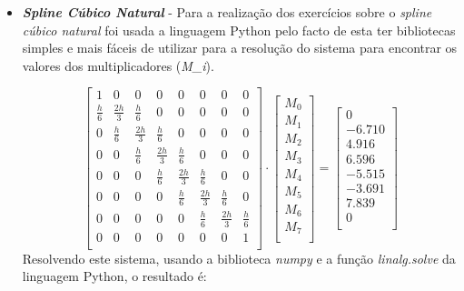 \documentclass[12pt, letterpaper,fleqn]{article}
\begin{document}
\begin{itemize}
    \item \textbf{\textit{Spline Cúbico Natural}} - Para a realização dos exercícios sobre o \textit{spline cúbico natural} foi usada a linguagem Python pelo facto de esta ter bibliotecas simples e mais fáceis de utilizar para a resolução do sistema para encontrar os valores dos multiplicadores (\textit{M_i}).

    $$
    \begin{bmatrix}
    1 & 0 & 0 & 0 & 0 & 0 & 0 & 0 \\[6pt]
    \frac{h}{6} & \frac{2h}{3} & \frac{h}{6} & 0 & 0 & 0 & 0 & 0 \\[6pt]
    0 & \frac{h}{6} & \frac{2h}{3} & \frac{h}{6} & 0 & 0 & 0 & 0 \\[6pt]
    0 & 0 & \frac{h}{6} & \frac{2h}{3} & \frac{h}{6} & 0 & 0 & 0 \\[6pt]
    0 & 0 & 0 & \frac{h}{6} & \frac{2h}{3} & \frac{h}{6} & 0 & 0 \\[6pt]
    0 & 0 & 0 & 0 & \frac{h}{6} & \frac{2h}{3} & \frac{h}{6} & 0 \\[6pt]
    0 & 0 & 0 & 0 & 0 & \frac{h}{6} & \frac{2h}{3} & \frac{h}{6} \\[6pt]
    0 & 0 & 0 & 0 & 0 & 0 & 0 & 1 \\
    \end{bmatrix}
    \cdot 
    \begin{bmatrix}
    M_0 \\[6pt]
    M_1 \\[6pt]
    M_2 \\[6pt]
    M_3 \\[6pt]
    M_4 \\[6pt]
    M_5 \\[6pt]
    M_6 \\[6pt]
    M_7 \\[6pt]
    \end{bmatrix}
    =
    \begin{bmatrix}
    0 \\[6pt] 
    -6.710 \\[6pt]
    4.916  \\[6pt]
    6.596  \\[6pt]
    -5.515 \\[6pt]
    -3.691 \\[6pt]
    7.839  \\[6pt]
    0 \\[6pt]
    \end{bmatrix}
    $$
    Resolvendo este sistema, usando a biblioteca \textit{numpy} e a função \textit{linalg.solve} da linguagem Python, o resultado é:

\end{itemize}
\end{document}
